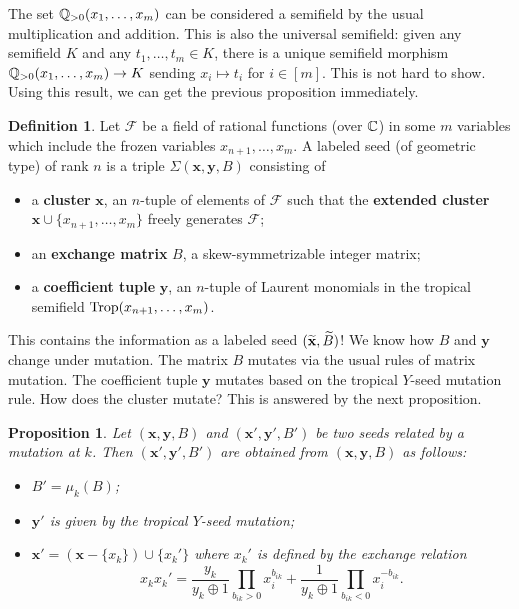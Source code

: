 \documentclass[]{pcmi}
\theoremstyle{plain}
\newtheorem{Proposition}[equation]{Proposition}
\theoremstyle{definition}
\newtheorem{Definition}[equation]{Definition}
\begin{document}
The set $\mathbb{Q}_{> 0}(x_1, \ldots, x_m)$ can be considered a semifield by the usual multiplication and addition. This is also the universal semifield: given any semifield $K$ and any $t_1, \ldots, t_m \in K$, there is a unique semifield morphism $\mathbb{Q}_{> 0}(x_1, \ldots, x_m) \to K$ sending $x_i \mapsto t_i$ for $i \in [m]$. This is not hard to show. Using this result, we can get the previous proposition immediately. 

\begin{Definition}
    Let $\mathscr{F}$ be a field of rational functions (over $\mathbb{C}$) in some $m$ variables which include the frozen variables $x_{n+1}, \ldots, x_m$. A labeled seed (of geometric type) of rank $n$ is a triple $\Sigma (\mathbf{x}, \mathbf{y}, B)$ consisting of 
    \begin{itemize}
        \item a \textbf{cluster} $\mathbf{x}$, an $n$-tuple of elements of $\mathscr{F}$ such that the \textbf{extended cluster} $\mathbf{x} \cup \{x_{n+1}, \ldots, x_m\}$ freely generates $\mathscr{F}$; 
        \item an \textbf{exchange matrix} $B$, a skew-symmetrizable integer matrix; 
        \item a \textbf{coefficient tuple} $\mathbf{y}$, an $n$-tuple of Laurent monomials in the tropical semifield $\operatorname{Trop}(x_{n+1}, \ldots, x_m)$. 
    \end{itemize}
\end{Definition}

This contains the information as a labeled seed $(\widetilde{\mathbf{x}}, \widetilde{B})$! We know how $B$ and $\mathbf{y}$ change under mutation. The matrix $B$ mutates via the usual rules of matrix mutation. The coefficient tuple $\mathbf{y}$ mutates based on the tropical $Y$-seed mutation rule. How does the cluster mutate? This is answered by the next proposition. 

\begin{Proposition}
    Let $(\mathbf{x}, \mathbf{y}, B)$ and $(\mathbf{x}', \mathbf{y}', B')$ be two seeds related by a mutation at $k$. Then $(\mathbf{x}', \mathbf{y}', B')$ are obtained from $(\mathbf{x}, \mathbf{y}, B)$ as follows:
    \begin{itemize}
        \item $B' = \mu_k(B)$;
        \item $\mathbf{y}'$ is given by the tropical $Y$-seed mutation; 
        \item $\mathbf{x}' = (\mathbf{x} - \{x_k\}) \cup \{x_k'\}$ where $x_k'$ is defined by the exchange relation 
        \begin{equation}
            x_k x_k' = \frac{y_k}{y_k \oplus 1} \prod_{b_{ik} > 0} x_i^{b_{ik}} + \frac{1}{y_k \oplus 1} \prod_{b_{ik} < 0} x_i^{-b_{ik}}. 
        \end{equation}
    \end{itemize}
\end{Proposition}
\end{document}
